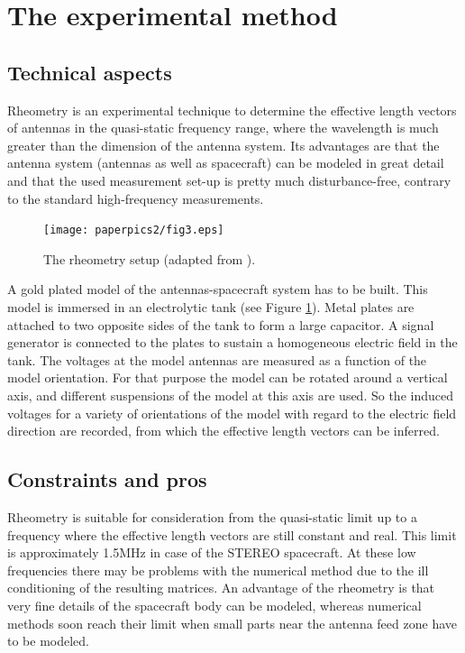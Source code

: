 \documentclass[a4paper,twocolumn]{esapub2005} %
\begin{document}
\section{The experimental method}
\subsection{Technical aspects}
Rheometry is an experimental technique to determine the effective length vectors of antennas in the quasi-static frequency range, where the wavelength is much greater than the dimension of the antenna system. Its advantages are that the antenna system (antennas as well as spacecraft) can be modeled in great detail and that the used measurement set-up is pretty much disturbance-free, contrary to the standard high-frequency measurements.

\begin{figure}[b]
\centering
  \texttt{[image: paperpics2/fig3.eps]}
\caption{The rheometry setup (adapted from \cite{rheometry}).\label{fig3}}
\end{figure}

A gold plated model of the antennas-spacecraft system has to be built. This model is immersed in an electrolytic tank (see Figure \ref{fig3}). Metal plates are attached to two opposite sides of the tank to form a large capacitor. A signal generator is connected to the plates to sustain a homogeneous electric field in the tank. The voltages at the model antennas are measured as a function of the model orientation. For that purpose the model can be rotated around a vertical axis, and different suspensions of the model at this axis are used. So the induced voltages for a variety of orientations of the model with regard to the electric field direction are recorded, from which the effective length vectors can be inferred.

\subsection{Constraints and pros}
Rheometry is suitable for consideration from the quasi-static limit up to a frequency where the effective length vectors are still constant and real. This limit is approximately 1.5MHz in case of the STEREO spacecraft. At these low frequencies there may be problems with the numerical method due to the ill conditioning of the resulting matrices. An advantage of the rheometry is that very fine details of the spacecraft body can be modeled, whereas numerical methods soon reach their limit when small parts near the antenna feed zone have to be modeled.
\end{document}
